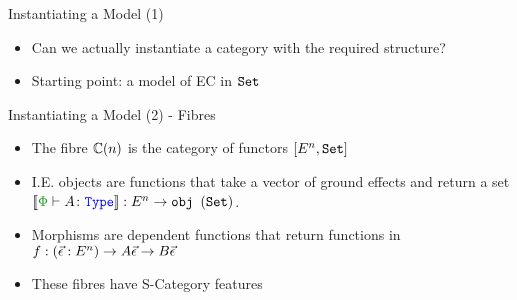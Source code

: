 \documentclass{beamer}
\newcommand\script[1]{}
\begin{document}
\begin{frame}{Instantiating a Model (1)}

    \begin{itemize}
        \item Can we actually instantiate a category with the required structure? 
        \item Starting point: a model of EC in $\texttt{Set}$
    \end{itemize}
    
    \script{
        - So far, we've only said what structures are required to model PEC.
        - Haven't shown that there actually exists an indexed category with the required properties
        - so let's do that
        - It's fairly well known that you can instantiate models of languages with the same features as EC in the category of sets and functions
        - We want to extend one of these models into one for PEC
    }
\end{frame}

\begin{frame}{Instantiating a Model (2) - Fibres}
    \begin{itemize}\setlength\itemsep{3em}
        \item The fibre $\mathbb{C}(n)$ is the category of functors $[E^n, \texttt{Set}]$
        \item I.E. objects are functions that take a vector of ground effects and return a set $\deno{\wellformedt{\P}{A}}: E^n \rightarrow \obj(\set)$.
        \item Morphisms are dependent functions that return functions in $f: (\vec{\epsilon}: E^n)\rightarrow A\vec{\epsilon}\rightarrow B\vec{\epsilon}$
        \item These fibres have S-Category features
    \end{itemize}

    \script{
        - Now we can think about the fibres
        - These are functor categories
        - I.E. their objects are functions returning sets and their morphisms are dependently typed functions
        - We can construct all the of the S-Category structure  as pointwise
    }
\end{frame}
\end{document}
